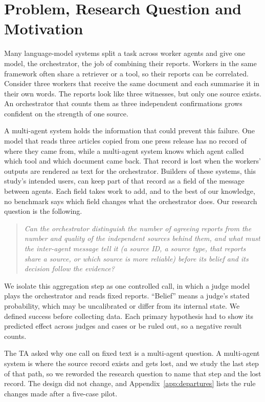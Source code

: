 \documentclass[11pt]{article}
\begin{document}
\section{Problem, Research Question and Motivation}
\label{sec:intro}
Many language-model systems split a task across worker agents and give one model, the orchestrator, the job of combining their reports. Workers in the same framework often share a retriever or a tool, so their reports can be correlated. Consider three workers that receive the same document and each summarise it in their own words. The reports look like three witnesses, but only one source exists. An orchestrator that counts them as three independent confirmations grows confident on the strength of one source.

A multi-agent system holds the information that could prevent this failure. One model that reads three articles copied from one press release has no record of where they came from, while a multi-agent system knows which agent called which tool and which document came back. That record is lost when the workers' outputs are rendered as text for the orchestrator. Builders of these systems, this study's intended users, can keep part of that record as a field of the message between agents. Each field takes work to add, and to the best of our knowledge, no benchmark says which field changes what the orchestrator does. Our research question is the following.
\begin{quote}\itshape
Can the orchestrator distinguish the number of agreeing reports from the number and quality of the independent sources behind them, and what must the inter-agent message tell it (a source ID, a source type, that reports share a source, or which source is more reliable) before its belief and its decision follow the evidence?
\end{quote}
We isolate this aggregation step as one controlled call, in which a judge model plays the orchestrator and reads fixed reports. ``Belief'' means a judge's stated probability, which may be uncalibrated or differ from its internal state. We defined success before collecting data. Each primary hypothesis had to show its predicted effect across judges and cases or be ruled out, so a negative result counts.

The TA asked why one call on fixed text is a multi-agent question. A multi-agent system is where the source record exists and gets lost, and we study the last step of that path, so we reworded the research question to name that step and the lost record. The design did not change, and Appendix~\ref{app:departures} lists the rule changes made after a five-case pilot.
\end{document}
